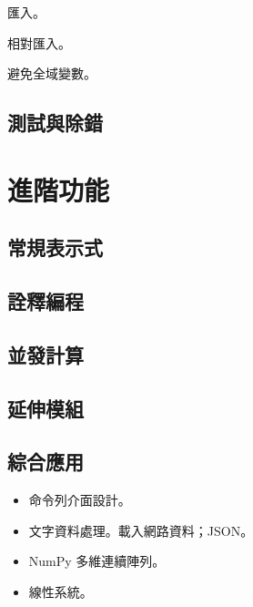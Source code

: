 \documentclass[a4paper,12pt]{book}
\theoremstyle{definition}
\begin{document}
匯入。

相對匯入。

避免全域變數。

\chapter{測試與除錯}
%
\label{c:debug}

\part{進階功能}
%
\label{p:advance}

\chapter{常規表示式}
%
\label{c:regexp}

\chapter{詮釋編程}
%
\label{c:meta}

\chapter{並發計算}
%
\label{c:concurrency}

\chapter{延伸模組}
%
\label{c:extension}

\chapter{綜合應用}
%
\label{c:beyond}

\begin{itemize}

\item 命令列介面設計。

\item 文字資料處理。載入網路資料；JSON。

\item NumPy 多維連續陣列。

\item 線性系統。

\end{itemize}

\backmatter



\end{document}
